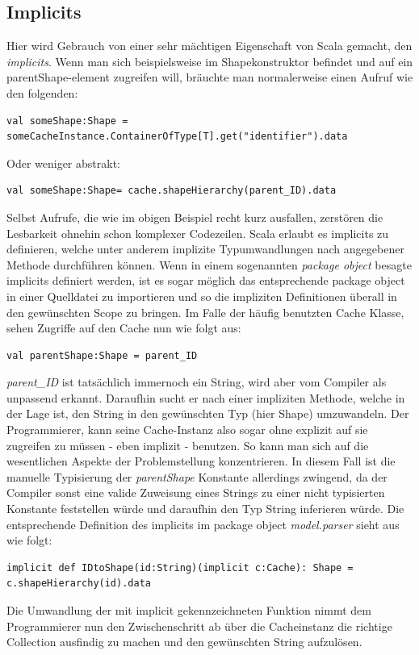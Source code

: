 \subsection{Implicits}\label{sectionimplicit}
Hier wird Gebrauch von einer sehr mächtigen Eigenschaft von Scala gemacht, den \textit{implicits}. Wenn man sich beispielsweise im Shapekonstruktor befindet und auf ein parentShape-element zugreifen will, bräuchte man normalerweise einen Aufruf wie den folgenden:
\begin{lstlisting}[style=scala, aboveskip=0pt]
val someShape:Shape =
someCacheInstance.ContainerOfType[T].get("identifier").data
\end{lstlisting}
Oder weniger abstrakt:
\begin{lstlisting}[style=scala, aboveskip=0pt]
val someShape:Shape= cache.shapeHierarchy(parent_ID).data
\end{lstlisting}
Selbst Aufrufe, die wie im obigen Beispiel recht kurz ausfallen, zerstören die Lesbarkeit ohnehin schon komplexer Codezeilen. Scala erlaubt es implicits zu definieren, welche unter anderem implizite Typumwandlungen nach angegebener Methode durchführen können. Wenn in einem sogenannten \textit{package object} besagte implicits definiert werden, ist es sogar möglich das entsprechende package object in einer Quelldatei zu importieren und so die impliziten Definitionen überall in den gewünschten Scope zu bringen. Im Falle der häufig benutzten Cache Klasse, sehen Zugriffe auf den Cache nun wie folgt aus:
\begin{lstlisting}[style=scala, aboveskip=0pt]
val parentShape:Shape = parent_ID
\end{lstlisting}
\textit{parent\_ID} ist tatsächlich immernoch ein String, wird aber vom Compiler als unpassend erkannt. Daraufhin sucht er nach einer impliziten Methode, welche in der Lage ist, den String in den gewünschten Typ (hier Shape) umzuwandeln. Der Programmierer, kann seine Cache-Instanz also sogar ohne explizit auf sie zugreifen zu müssen - eben implizit - benutzen. So kann man sich auf die wesentlichen Aspekte der Problemstellung konzentrieren. In diesem Fall ist die manuelle Typisierung der \textit{parentShape} Konstante allerdings zwingend, da der Compiler sonst eine valide Zuweisung eines Strings zu einer nicht typisierten Konstante feststellen würde und daraufhin den Typ String inferieren würde. Die entsprechende Definition des implicits im package object \textit{model.parser} sieht aus wie folgt:
\begin{lstlisting}[style=scala, aboveskip=0pt]
implicit def IDtoShape(id:String)(implicit c:Cache): Shape =
c.shapeHierarchy(id).data
\end{lstlisting}Die Umwandlung der mit implicit gekennzeichneten Funktion nimmt dem Programmierer nun den Zwischenschritt ab über die Cacheinstanz die richtige Collection ausfindig zu machen und den gewünschten String aufzulösen.

